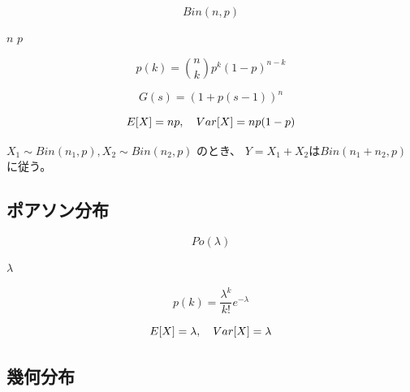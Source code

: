 \begin{outline}[description]
  \1 [表記]
  \begin{equation}
    Bin(n, p)
  \end{equation}
  
  \1 [パラメータ]
  \2
  \2 [試行回数] \(n\)
  \2 [成功確率] \(p\)
  
  \1 [確率関数]
  \begin{equation}
    p (k) = \binom{n}{k} p^k (1-p)^{n-k}
  \end{equation}
  
  \1 [確率母関数]
  \begin{equation}
    G (s) = (1 + p (s - 1))^n
  \end{equation}
  
  \1 [期待値・分散]
  \begin{equation}
    E \qty [ X] = np, \quad Var \qty [ X ] = np (1 - p)
  \end{equation}
  
  \1 [再生性]
  \(X_1 \sim Bin(n_1, p), X_2 \sim Bin(n_2, p)\) のとき、
  \(Y = X_1 + X_2\)は\(Bin(n_1 + n_2, p)\)に従う。
\end{outline}

\subsection{ポアソン分布}

\begin{outline}[description]
  \1 [意味]
  
  \1 [表記]
  \begin{equation}
    Po(\lambda)
  \end{equation}
  
  \1 [パラメータ]
  \2
  \2 [平均] \(\lambda\)
  
  \1 [確率関数]
  \begin{equation}
    p (k) = \frac{\lambda^{k}}{k!} e^{-\lambda}
  \end{equation}
  
  \1 [確率母関数]
  
  \1 [期待値・分散]
  \begin{equation}
    E \qty [ X] = \lambda , \quad Var \qty [ X ] = \lambda
  \end{equation}
\end{outline}

\subsection{幾何分布}

